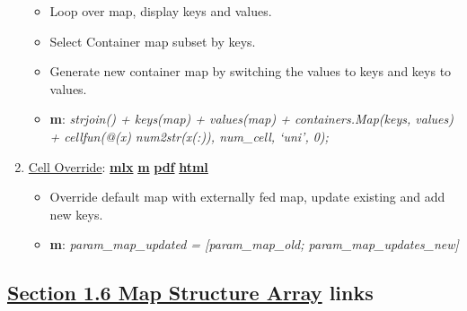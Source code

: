 \documentclass[
]{book}
\providecommand{\tightlist}{%
  \setlength{\itemsep}{0pt}\setlength{\parskip}{0pt}}
\begin{document}
\begin{enumerate}
  \begin{itemize}
  \tightlist
  \item
    Loop over map, display keys and values.
  \item
    Select Container map subset by keys.
  \item
    Generate new container map by switching the values to keys and keys to values.
  \item
    \textbf{m}: \emph{strjoin() + keys(map) + values(map) + containers.Map(keys, values) + cellfun(@(x) num2str(x(:)), num\_cell, `uni', 0);}
  \end{itemize}
\item
  \href{https://fanwangecon.github.io/M4Econ/amto/container/htmlpdfm/fs_map_override.html}{Cell Override}: \href{https://github.com/FanWangEcon/M4Econ/blob/master/amto/container/fs_map_override.mlx}{\textbf{mlx}} \textbar{} \href{https://github.com/FanWangEcon/M4Econ/blob/master/amto/container/htmlpdfm/fs_map_override.m}{\textbf{m}} \textbar{} \href{https://github.com/FanWangEcon/M4Econ/blob/master/amto/container/htmlpdfm/fs_map_override.pdf}{\textbf{pdf}} \textbar{} \href{https://fanwangecon.github.io/M4Econ/amto/container/htmlpdfm/fs_map_override.html}{\textbf{html}}

  \begin{itemize}
  \tightlist
  \item
    Override default map with externally fed map, update existing and add new keys.
  \item
    \textbf{m}: \emph{param\_map\_updated = {[}param\_map\_old; param\_map\_updates\_new{]}}
  \end{itemize}
\end{enumerate}

\hypertarget{section-1.6-map-structure-arraymap-structure-array-links}{%
\subsection{\texorpdfstring{\protect\hyperlink{map-structure-array}{Section 1.6 Map Structure Array} links}{Section 1.6 Map Structure Array links}}\label{section-1.6-map-structure-arraymap-structure-array-links}}
\end{document}
